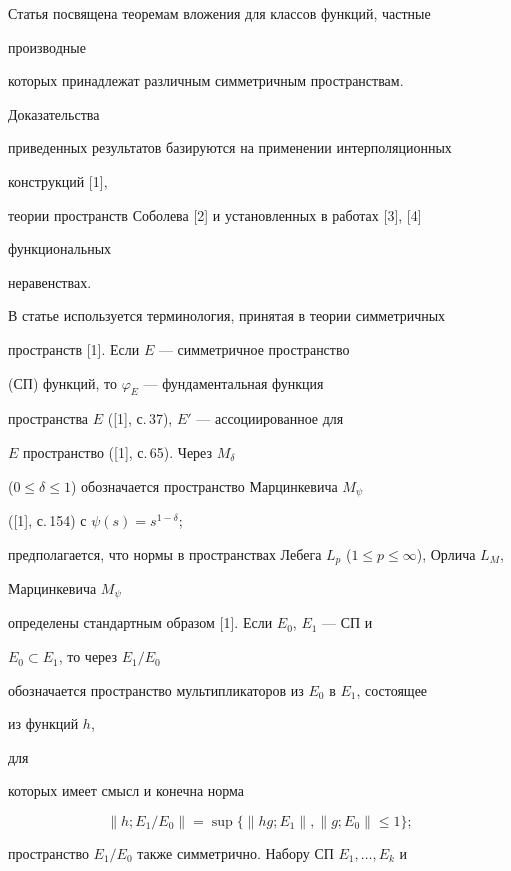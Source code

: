 \label{begin} 


 


 


Статья посвящена теоремам вложения для классов функций, частные 


производные 


которых принадлежат различным симметричным пространствам. 


Доказательства 


приведенных результатов базируются на применении интерполяционных 


конструкций [1], 


теории пространств Соболева [2] и установленных в работах [3], [4] 


функциональных 


неравенствах. 


 


В статье используется терминология, принятая в теории симметричных


пространств [1]. Если $E$ --- симметричное пространство 


(СП) функций, то $\varphi_E$ --- фундаментальная функция 


пространства $E$ ([1], с.\,37), $E'$ --- ассоциированное для 


$E$ пространство ([1], с.\,65). Через $M_\delta$ 


($0\le\delta\le 1$) обозначается пространство Марцинкевича $M_\psi$ 


([1], с.\,154) с $\psi(s)=s^{1-\delta}$; 


предполагается, что нормы в пространствах Лебега $L_p$ ($1\le 


p\le\infty$), Орлича $L_M$, 


Марцинкевича $M_\psi$ 


определены стандартным образом [1]. Если $E_0$, $E_1$ --- СП и 


$E_0\subset E_1$, то через $E_1/E_0$ 


обозначается пространство мультипликаторов из $E_0$ в $E_1$, состоящее 


из функций $h$, 


для 


которых имеет смысл и конечна норма 


$$ 


\|h;E_1/E_0\|=\sup\{\|hg;E_1\|,\|g;E_0\|\le 1\}; 


$$ 


пространство $E_1/E_0$ также симметрично. Набору СП $E_1,\dotsc,E_k$ и 


